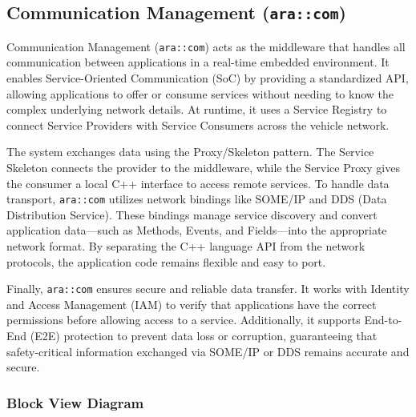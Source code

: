 
\subsection{Communication Management (\texttt{ara::com})}

Communication Management (\texttt{ara::com}) acts as the middleware that handles all communication between applications in a real-time embedded environment. It enables Service-Oriented Communication (SoC) by providing a standardized API, allowing applications to offer or consume services without needing to know the complex underlying network details. At runtime, it uses a Service Registry to connect Service Providers with Service Consumers across the vehicle network.

The system exchanges data using the Proxy/Skeleton pattern. The Service Skeleton connects the provider to the middleware, while the Service Proxy gives the consumer a local C++ interface to access remote services. To handle data transport, \texttt{ara::com} utilizes network bindings like SOME/IP and DDS (Data Distribution Service). These bindings manage service discovery and convert application data—such as Methods, Events, and Fields—into the appropriate network format. By separating the C++ language API from the network protocols, the application code remains flexible and easy to port.

Finally, \texttt{ara::com} ensures secure and reliable data transfer. It works with Identity and Access Management (IAM) to verify that applications have the correct permissions before allowing access to a service. Additionally, it supports End-to-End (E2E) protection to prevent data loss or corruption, guaranteeing that safety-critical information exchanged via SOME/IP or DDS remains accurate and secure.


\subsubsection{Block View Diagram}

